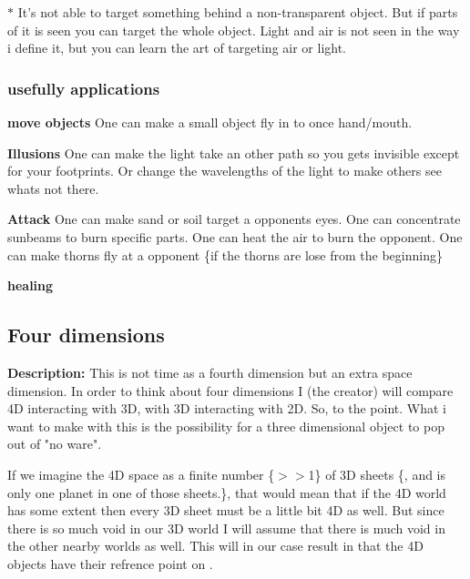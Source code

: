 \documentclass{article}
\begin{document}
$*$ It's not able to target something behind a non-transparent object. But if parts of it is seen you can target the whole object. Light and air is not seen in the way i define it, but you can learn the art of targeting air or light.

\subsubsection{usefully applications}

\textbf{move objects} One can make a small object fly in to once hand/mouth.

\textbf{Illusions} One can make the light take an other path so you gets invisible except for your footprints. Or change the wavelengths of the light to make others see whats not there.

\textbf{Attack} One can make sand or soil target a opponents eyes. One can concentrate sunbeams to burn specific parts. One can heat the air to burn the opponent. One can make thorns fly at a opponent \{if the thorns are lose from the beginning\}

\textbf{healing}


\subsection{Four dimensions}%
\label{dimensions}

\textbf{Description: }This is not time as a fourth dimension but an extra space dimension.  In order to think about four dimensions I (the creator) will compare 4D interacting with 3D, with 3D interacting with 2D. So, to the point. What i want to make with this is the possibility for a three dimensional object to pop out of "no ware". 

If we imagine the 4D space as a finite number \{$>>$1\} of 3D sheets \{, and  is only one planet in one of those sheets.\}, that would mean that if the 4D world has some extent then every 3D sheet must be a little bit 4D as well. But since there is so much void in our 3D world I will assume that there is much void in the other nearby worlds as well. This will in our case result in that the 4D objects have their refrence point on .
\end{document}
